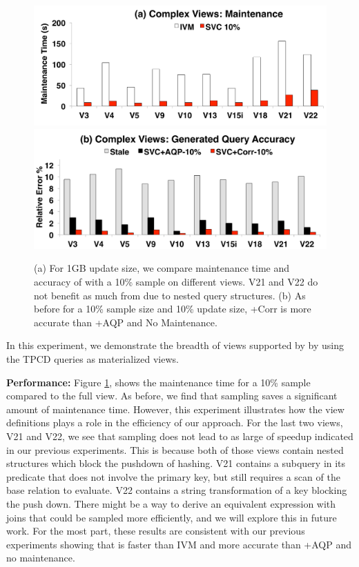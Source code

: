 \begin{figure}[t]\vspace{-2em}
\centering
 \includegraphics[scale=0.13]{exp/msqv_1.pdf}
 \includegraphics[scale=0.13]{exp/msqv_2.pdf}\vspace{-1em}
 \caption{(a) For 1GB update size, we compare maintenance time and accuracy of \svc with a 10\% sample on different views. V21 and V22 do not benefit as much from \svc due to nested query structures. (b) As before for a 10\% sample size and 10\% update size, \svcnospace+Corr is more accurate than \svcnospace+AQP and No Maintenance.  \label{exp3-acc}}
\end{figure}
In this experiment, we demonstrate the breadth of views supported by \svc by using the TPCD queries as materialized views.

\textbf{Performance: }
Figure \ref{exp3-acc}, shows the maintenance time for a 10\% sample compared to the full view.
As before, we find that sampling saves a significant amount of maintenance time.
However, this experiment illustrates how the view definitions plays a role in the efficiency of our approach.
For the last two views, V21 and V22, we see that sampling does not lead to as large of speedup indicated in our previous experiments.  
This is because both of those views contain nested structures which block the pushdown of hashing.
V21 contains a subquery in its predicate that does not involve the primary key, but still requires a scan of the base relation to evaluate.
V22 contains a string transformation of a key blocking the push down.
There might be a way to derive an equivalent expression with joins that could be sampled more efficiently, and we will explore this in future work.
For the most part, these results are consistent with our previous experiments showing that \svc is faster than IVM and more accurate than \svcnospace+AQP and no maintenance.


